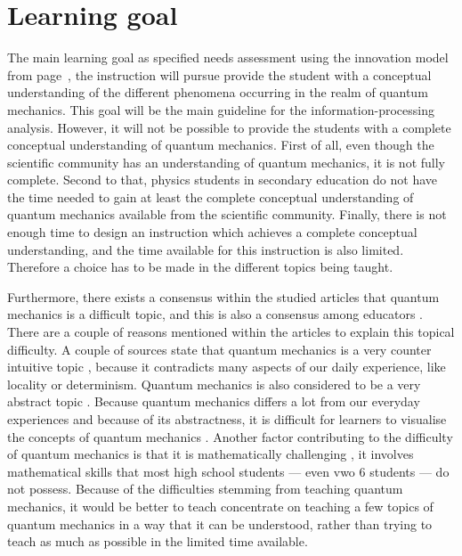 \documentclass[11pt,twoside]{report} %
\begin{document}
\section{Learning goal}

The main learning goal as specified needs assessment using the innovation model from page~\pageref{ssch:needsassessmentinnovation}, the instruction will pursue provide the student with a conceptual understanding of the different phenomena occurring in the realm of quantum mechanics. This goal will be the main guideline for the information-processing analysis. However, it will not be possible to provide the students with a complete conceptual understanding of quantum mechanics. First of all, even though the scientific community has an understanding of quantum mechanics, it is not fully complete. Second to that, physics students in secondary education do not have the time needed to gain at least the complete conceptual understanding of quantum mechanics available from the scientific community. Finally, there is not enough time to design an instruction which achieves a complete conceptual understanding, and the time available for this instruction is also limited. Therefore a choice has to be made in the different topics being taught.

Furthermore, there exists a consensus within the studied articles that quantum mechanics is a difficult topic, and this is also a consensus among educators \cite{gianino,papaphotis1,papaphotis2}. There are a couple of reasons mentioned within the articles to explain this topical difficulty. A couple of sources state that quantum mechanics is a very counter intuitive topic \cite{henriksen, levrini, mckagan, singh2}, because it contradicts many aspects of our daily experience, like locality or determinism. Quantum mechanics is also considered to be a very abstract topic \cite{barnes, gianino, mckagan, papaphotis1, singh1}. Because quantum mechanics differs a lot from our everyday experiences and because of its abstractness, it is difficult for learners to visualise the concepts of quantum mechanics \cite{henriksen, mckagan}. Another factor contributing to the difficulty of quantum mechanics is that it is mathematically challenging \cite{gianino, mckagan}, it involves mathematical skills that most high school students --- even vwo 6 students --- do not possess. Because of the difficulties stemming from teaching quantum mechanics, it would be better to teach concentrate on teaching a few topics of quantum mechanics in a way that it can be understood, rather than trying to teach as much as possible in the limited time available.
\end{document}
